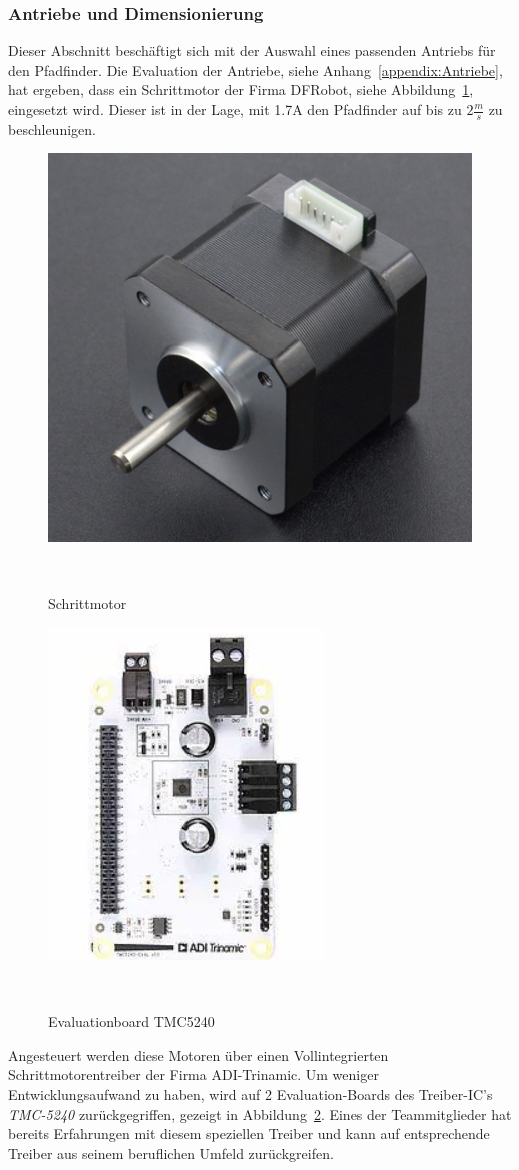 \documentclass[main.tex]{subfiles} %
\begin{document}

\subsubsection{Antriebe und Dimensionierung}

Dieser Abschnitt beschäftigt sich mit der Auswahl eines passenden Antriebs für
den Pfadfinder. Die Evaluation der Antriebe, siehe
Anhang~\ref{appendix:Antriebe}, hat ergeben, dass ein Schrittmotor der Firma
DFRobot, siehe Abbildung~\ref{Schrittmotor_FIT0278}, eingesetzt wird. Dieser
ist in der Lage, mit 1.7A den Pfadfinder auf bis zu $2\frac{m}{s}$ zu
beschleunigen.

\begin{figure}[H]
    \centering
    \includegraphics[width = 0.25 \linewidth]{fig_Antriebe_und_Dimensionierung/DFRobot_Stepper_FIT0278.png}
    \caption{Schrittmotor}~\label{Schrittmotor_FIT0278}
\end{figure}

\begin{figure}[H]
    \centering
    \includegraphics[width = 0.25 \linewidth]{fig_Antriebe_und_Dimensionierung/TMC_5240_EVAL.png}
    \caption{Evaluationboard TMC5240}~\label{Schrittmotorentreiber_EVAL}
\end{figure}

Angesteuert werden diese Motoren über einen Vollintegrierten
Schrittmotorentreiber der Firma ADI-Trinamic. Um weniger Entwicklungsaufwand zu
haben, wird auf 2 Evaluation-Boards des Treiber-IC's \textit{TMC-5240}
zurückgegriffen, gezeigt in Abbildung~\ref{Schrittmotorentreiber_EVAL}. Eines
der Teammitglieder hat bereits Erfahrungen mit diesem speziellen Treiber und
kann auf entsprechende Treiber aus seinem beruflichen Umfeld zurückgreifen.
\end{document}
